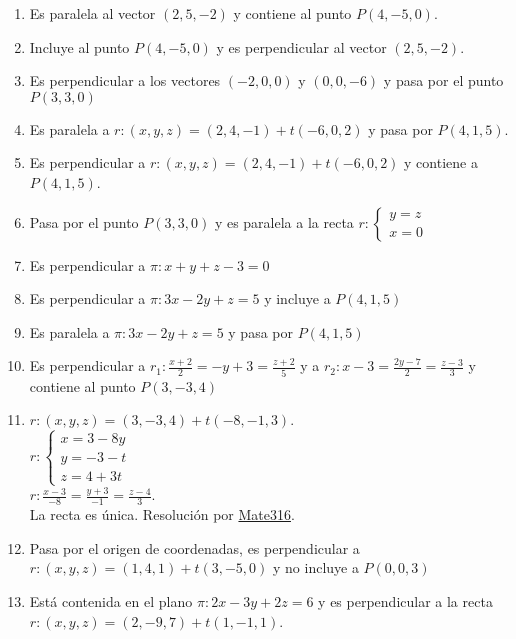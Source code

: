 \documentclass[a4paper]{article}
\newcommand{\answer}{\item[**]}
\begin{document}
\begin{enumerate}
\begin{enumerate} [label=(\alph*)]
		\item Es paralela al vector $(2,5,-2)$ y contiene al punto $P(4,-5,0)$.

		\item Incluye al punto $P(4,-5,0)$ y es perpendicular al vector $(2,5,-2)$.

		\item Es perpendicular a los vectores $(-2,0,0)$ y $(0,0,-6)$ y pasa por el punto $P(3,3,0)$

		\item Es paralela a $r: (x,y,z)=(2,4,-1)+t(-6,0,2)$ y pasa por $P(4,1,5)$.

		\item Es perpendicular a $r: (x,y,z)=(2,4,-1)+t(-6,0,2)$ y contiene a $P(4,1,5)$.

		\item Pasa por el punto $P(3,3,0)$ y es paralela a la recta $r: \left\{\begin{matrix}y=z\\x=0\end{matrix}\right.$

		\item Es perpendicular a $\pi: x+y+z-3=0$

		\item Es perpendicular a $\pi: 3x-2y+z=5$ y incluye a $P(4,1,5)$

		\item Es paralela a $\pi: 3x-2y+z=5$ y pasa por $P(4,1,5)$

		\item Es perpendicular a $r_1: \displaystyle{\frac{x+2}{2}=-y+3=\frac{z+2}{5}}$ y a $r_2: \displaystyle{x-3=\frac{2y-7}{2}=\frac{z-3}{3}}$ y contiene al punto $P(3,-3,4)$
		\answer $r: (x,y,z)=(3,-3,4)+t(-8,-1,3)$. \\ $r: \left\{\begin{matrix}x=3-8y\\y=-3-t\\z=4+3t\end{matrix}\right.$ \\ $r: \displaystyle{\frac{x-3}{-8}=\frac{y+3}{-1}=\frac{z-4}{3}}$. \\ La recta es única. Resolución por \href{https://youtu.be/KebOzsUUmq4?t=458}{Mate316}.

		\item Pasa por el origen de coordenadas, es perpendicular a $r: (x,y,z)=(1,4,1)+t(3,-5,0)$ y no incluye a $P(0,0,3)$

		\item Está contenida en el plano $\pi: 2x-3y+2z=6$ y es perpendicular a la recta $r: (x,y,z)=(2,-9,7)+t(1,-1,1)$.


\end{enumerate}
\end{enumerate}
\end{document}
